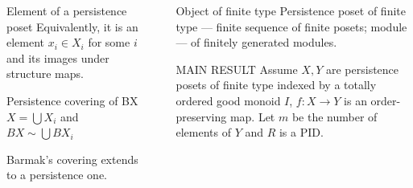 \documentclass[usenames,dvipsnames]{beamer}
\begin{document}
\begin{frame}{}
\begin{columns}[t]
\begin{column}{.22\linewidth}
\begin{block}{Element of a persistence poset}
              Equivalently, it is an element $x_i \in X_i$ for some $i$ and its images under structure maps.
            \end{block}
            \begin{block}{Persistence covering of BX}
              $X = \bigcup X_i$ and $BX \sim \bigcup BX_i$\par
              Barmak's covering extends to a persistence one.
            \end{block}
        \end{column}
      \begin{column}{0.0001\linewidth}
          \begin{center}
          \rule{2pt}{0.4\textheight}
          \end{center}
      \end{column}
      \begin{column}{.38\linewidth}
        \begin{block}{Object of finite type}
          Persistence poset of finite type --- finite sequence of finite posets; module --- of finitely generated modules.
        \end{block}
        \begin{block}{\large MAIN RESULT}
          Assume $X, Y$ are persistence posets of finite type indexed by a totally ordered good monoid $I$, $f : X \to Y$ is an order-preserving map. Let $m$ be the number of elements of $Y$ and $R$ is a PID.\\


\end{block}
\end{column}
\end{columns}
\end{frame}
\end{document}
